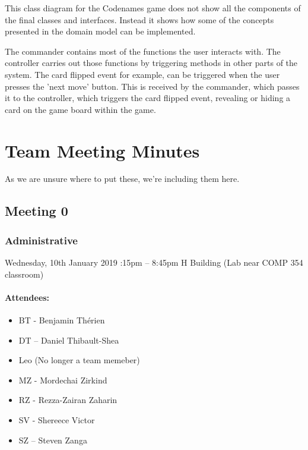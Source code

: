 \documentclass[10pt, a4paper]{article}
\begin{document}
			This class diagram for the Codenames game does not show all the components of the final classes and interfaces. Instead it shows how some of the concepts presented in the domain model can be implemented.  
			
			The commander contains most of the functions the user interacts with. The controller carries out those functions by triggering methods in other parts of the system. The card flipped event for example, can  be triggered when the user presses the 'next move' button. This is received by the commander, which passes it to the controller, which triggers the card flipped event, revealing or hiding a card on the game board within the game. 
			
			
			\pagebreak 
			
			\section{Team Meeting Minutes}
			As we are unsure where to put these, we're including them here.			
			
			\subsection{Meeting 0}
			
			\subsubsection{Administrative}
			Wednesday, 10th January 2019 :15pm – 8:45pm \textbar  H Building (Lab near COMP 354 classroom)  
			\paragraph{Attendees:}
			\begin{itemize}
				\item BT - Benjamin Th\'erien
				\item DT – Daniel Thibault-Shea
				\item Leo (No longer a team memeber)
				\item MZ - Mordechai Zirkind 
				\item RZ - Rezza-Zairan Zaharin
				\item SV - Shereece Victor
				\item SZ – Steven Zanga
			\end{itemize}
			
			
\end{document}
